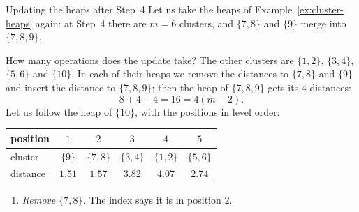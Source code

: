 \documentclass[a4paper,12pt,oneside]{report}
\begin{document}
{
\begin{framedexample}{Updating the heaps after Step~4}
Let us take the heaps of Example~\ref{ex:cluster-heaps} again: at
Step~4 there are $m=6$ clusters, and $\{7,8\}$ and $\{9\}$ merge into
$\{7,8,9\}$.
\begin{center}
\end{center}
How many operations does the update take? The other
clusters are $\{1,2\}$, $\{3,4\}$, $\{5,6\}$ and $\{10\}$. In each of
their heaps we remove the distances to $\{7,8\}$ and $\{9\}$ and insert
the distance to $\{7,8,9\}$; then the heap of $\{7,8,9\}$ gets its $4$
distances:
\[
  8+4+4=16=4(m-2).
\]
Let us follow the heap of $\{10\}$, with the positions in level order:
\begin{center}
\renewcommand{\arraystretch}{1.15}
\begin{tabular}{lccccc}
  position & $1$ & $2$ & $3$ & $4$ & $5$\\\hline
  cluster & $\{9\}$ & $\{7,8\}$ & $\{3,4\}$ & $\{1,2\}$ & $\{5,6\}$\\
  distance & $1.51$ & $1.57$ & $3.82$ & $4.07$ & $2.74$
\end{tabular}
\end{center}
\begin{enumerate}
  \item \emph{Remove $\{7,8\}$.} The index says it is in position $2$.

\end{enumerate}
\end{framedexample}}
\end{document}
